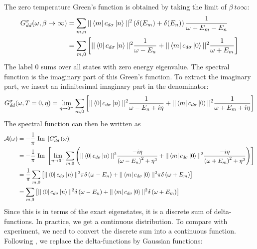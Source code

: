 \documentclass[12pt,twoside]{report}
\numberwithin{equation}{section}
\begin{document}
The zero temperature Green's function is obtained by taking the limit of \(\beta\ to \infty\):
\begin{equation}\begin{aligned}
	G_{d d}^\sigma(\omega, \beta \to \infty) &= \sum_{m,n}||\bra{m}c_{d\sigma}\ket{n}||^2\left(\delta(E_m) + \delta(E_n)\right)\frac{1}{\omega + E_m - E_n}\\
						 &=\sum_{m,0}\left[||\bra{0}c_{d\sigma}\ket{n}||^2\frac{1}{\omega - E_n} + ||\bra{m}c_{d\sigma}\ket{0}||^2\frac{1}{\omega + E_m}\right]\\
\end{aligned}\end{equation}
The label 0 sums over all states with zero energy eigenvalue. The spectral function is the imaginary part of this Green's function. To extract the imaginary part, we insert an infinitesimal imaginary part in the denominator:
\begin{equation}\begin{aligned}
	G_{d d}^\sigma(\omega, T = 0, \eta) = \lim_{\eta \to 0^-}\sum_{m,0}\left[||\bra{0}c_{d\sigma}\ket{n}||^2\frac{1}{\omega - E_n + i\eta} + ||\bra{m}c_{d\sigma}\ket{0}||^2\frac{1}{\omega + E_m + i\eta}\right]\\
\end{aligned}\end{equation}
The spectral function can then be written as
\begin{equation}\begin{aligned}
	\mathcal{A(\omega)} &= -\frac{1}{\pi}\text{ Im }\left[G_{dd}^\sigma\left( \omega \right) \right] \\
			    &= -\frac{1}{\pi}\text{ Im }\left[\lim_{\eta \to 0^-}\sum_{m,0}\left(||\bra{0}c_{d\sigma}\ket{n}||^2\frac{-i\eta}{\left(\omega - E_n\right)^2 + \eta^2} + ||\bra{m}c_{d\sigma}\ket{0}||^2\frac{-i\eta}{\left(\omega + E_m\right)^2 + \eta^2}\right)\right]\\
			    &= \frac{1}{\pi}\sum_{m,0}\left[||\bra{0}c_{d\sigma}\ket{n}||^2\pi\delta\left(\omega - E_n\right) + ||\bra{m}c_{d\sigma}\ket{0}||^2\pi\delta\left(\omega + E_m\right)\right]\\
			    &= \sum_{m,0}\left[||\bra{0}c_{d\sigma}\ket{n}||^2\delta\left(\omega - E_n\right) + ||\bra{m}c_{d\sigma}\ket{0}||^2\delta\left(\omega + E_m\right)\right]\\
\end{aligned}\end{equation}
Since this is in terms of the exact eigenstates, it is a discrete sum of delta-functions. In practice, we get a continuous distribution. To compare with experiment, we need to convert the discrete sum into a continuous function. Following \cite{bulla_costi_nrg}, we replace the delta-functions by Gaussian functions:
\end{document}
